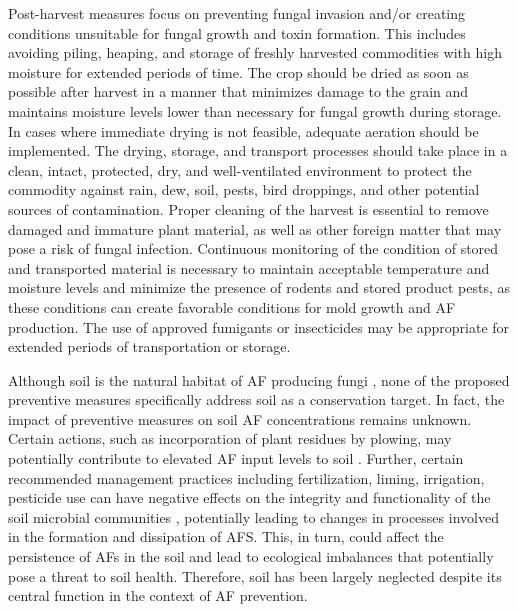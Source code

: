Post-harvest measures focus on preventing fungal invasion and/or creating conditions unsuitable for fungal growth and toxin formation. This includes avoiding piling, heaping, and storage of freshly harvested commodities with high moisture for extended periods of time. The crop should be dried as soon as possible after harvest in a manner that minimizes damage to the grain and maintains moisture levels lower than necessary for fungal growth during storage. In cases where immediate drying is not feasible, adequate aeration should be implemented. The drying, storage, and transport processes should take place in a clean, intact, protected, dry, and well-ventilated environment to protect the commodity against rain, dew, soil, pests, bird droppings, and other potential sources of contamination. Proper cleaning of the harvest is essential to remove damaged and immature plant material, as well as other foreign matter that may pose a risk of fungal infection. Continuous monitoring of the condition of stored and transported material is necessary to maintain acceptable temperature and moisture levels and minimize the presence of rodents and stored product pests, as these conditions can create favorable conditions for mold growth and AF production. The use of approved fumigants or insecticides may be appropriate for extended periods of transportation or storage.

Although soil is the natural habitat of AF producing fungi \citep{horn2003ecology, elmholt2008mycotoxins}, none of the proposed preventive measures specifically address soil as a conservation target. In fact, the impact of preventive measures on soil AF concentrations remains unknown. Certain actions, such as incorporation of plant residues by plowing, may potentially contribute to elevated AF input levels to soil \citep{fouche2020aflatoxins}.  Further, certain recommended management practices including fertilization, liming, irrigation, pesticide use can have negative effects on the integrity and functionality of the soil microbial communities \citep{tilman2002agricultural, sanaullah2020terrestrial}, potentially leading to changes in processes involved in the formation and dissipation of AFS. This, in turn, could affect the persistence of AFs in the soil and lead to ecological imbalances that potentially pose a threat to soil health. Therefore, soil has been largely neglected despite its central function in the context of AF prevention.



